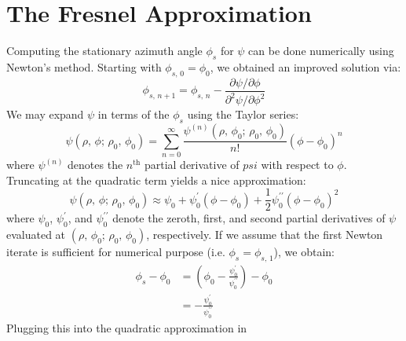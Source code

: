 \documentclass{article}
\begin{document}
    \section{The Fresnel Approximation}
        Computing the stationary azimuth angle $\phi_{s}$ for $\psi$ can be
        done numerically using Newton's method. Starting with
        $\phi_{s,\,0}=\phi_{0}$, we obtained an improved solution via:
        \begin{equation}
            \phi_{s,\,n+1}=\phi_{s,\,n}-
            \frac{\partial\psi/\partial\phi}
                 {\partial^{2}\psi/\partial\phi^{2}}
        \end{equation}
        We may expand $\psi$ in terms of the $\phi_{s}$ using the Taylor
        series:
        \begin{equation}
            \psi(\rho,\,\phi;\,\rho_{0},\,\phi_{0})
            =\sum_{n=0}^{\infty}
                \frac{\psi^{(n)}(\rho,\,\phi_{0};\,\rho_{0},\,\phi_{0})}{n!}
                (\phi-\phi_{0})^{n}
        \end{equation}
        where $\psi^{(n)}$ denotes the $n^{\textrm{th}}$ partial derivative of
        $psi$ with respect to $\phi$. Truncating at the quadratic term yields
        a nice approximation:
        \begin{equation}
            \label{eqn:quadratic_taylor}
            \psi(\rho,\,\phi;\,\rho_{0},\,\phi_{0})
            \approx
            \psi_{0}+\psi^{\prime}_{0}(\phi-\phi_{0})
            +\frac{1}{2}\psi^{\prime\prime}_{0}(\phi-\phi_{0})^{2}
        \end{equation}
        where $\psi_{0}$, $\psi^{\prime}_{0}$, and $\psi^{\prime\prime}_{0}$
        denote the zeroth, first, and second partial derivatives of $\psi$
        evaluated at $(\rho,\,\phi_{0};\,\rho_{0},\,\phi_{0})$, respectively.
        If we assume that the first Newton iterate is sufficient for numerical
        purpose (i.e. $\phi_{s}=\phi_{s,\,1}$), we obtain:
        \begin{subequations}
            \begin{align}
                \phi_{s}-\phi_{0}
                &=\left(
                    \phi_{0}-
                    \frac{\psi^{\prime}_{0}}{\psi^{\prime\prime}_{0}}
                \right)-\phi_{0}\\[1em]
                &=-\frac{\psi^{\prime}_{0}}{\psi^{\prime\prime}_{0}}
            \end{align}
        \end{subequations}
        Plugging this into the quadratic approximation in
\end{document}
